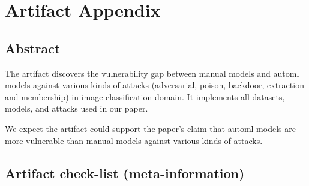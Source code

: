\documentclass[letterpaper,twocolumn,10pt]{article}
\begin{document}


\appendix
\section{Artifact Appendix}

\subsection{Abstract}

The artifact discovers the vulnerability gap between manual models and automl models against various kinds of attacks (adversarial, poison, backdoor, extraction and membership) in image classification domain. It implements all datasets, models, and attacks used in our paper.

We expect the artifact could support the paper's claim that automl models are more vulnerable than manual models against various kinds of attacks.

\subsection{Artifact check-list (meta-information)}
\end{document}
